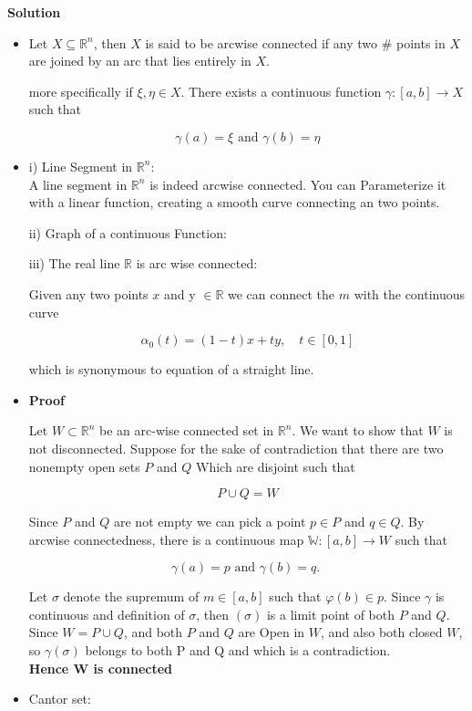 \documentclass{article}
\begin{document}
\textbf{Solution}\\
\begin{itemize}
    \item Let $X \subseteq \mathbb{R}^{n}$, then $X$ is said to be arcwise connected if any two \# points in $X$ are joined by an arc that lies entirely in $X$.

more specifically if $\xi, \eta \in X$. There exists a continuous function $\gamma:[a, b] \rightarrow X$ such that

$$
\gamma(a)=\xi \text { and } \gamma(b)=\eta
$$
\item i) Line Segment in $\mathbb{R}^{n}$:\\
A line segment in $\mathbb{R}^{n}$ is indeed arcwise connected. You can Parameterize it with a linear function, creating a smooth curve connecting an two points.

ii) Graph of a continuous Function:

iii) The real line $\mathbb{R}$ is arc wise connected:

Given any two points $x$ and y $\in \mathbb{R}$ we can connect the $m$ with the continuous curve

$$
\alpha_{0}(t)=(1-t) x+t y, \quad t \in[0,1]
$$

which is synonymous to equation of a straight line.

\item \textbf{Proof}

Let $W \subset \mathbb{R}^{n}$ be an arc-wise connected set in $\mathbb{R}^{n}$. We want to show that $W$ is not disconnected. Suppose for the sake of contradiction that there are two nonempty open sets $P$ and $Q$ Which are disjoint such that

$$
P \cup Q=W
$$

Since $P$ and $Q$ are not empty we can pick a point $p \in P$ and $q \in Q$. By arcwise connectedness, there is a continuous map $\mathbb{W}:[a, b] \rightarrow W$ such that

$$
\gamma(a)=p \text { and } \gamma(b)=q \text {. }
$$

Let $\sigma$ denote the supremum of $m \in[a, b]$ such that $\varphi(b) \in p$. Since $\gamma$ is continuous and definition of $\sigma$, then $(\sigma)$ is a limit point of both $P$ and $Q$. Since $W=P \cup Q$, and both $P$ and $Q$ are Open in $W$, and also both closed $W$, so $\gamma(\sigma)$ belongs to both P and Q and which is a contradiction.\\
\textbf{Hence W is connected}
\item Cantor set:\\


\end{itemize}
\end{document}
